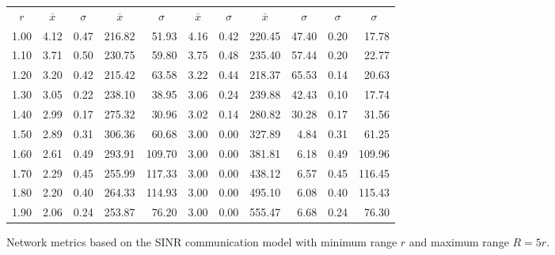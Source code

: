 \documentclass{article}
\begin{document}
\begin{figure}[h]
\begin{center}
\begin{tabular}{|r|rr|rr|rr|rr|rr|}
\hline
\multicolumn{1}{|c|}{$r$} & \multicolumn{1}{|c}{$\overline{x}$} & \multicolumn{1}{c|}{$\sigma$} & \multicolumn{1}{|c}{$\overline{x}$} & \multicolumn{1}{c|}{$\sigma$} & \multicolumn{1}{|c}{$\overline{x}$} & \multicolumn{1}{c|}{$\sigma$} & \multicolumn{1}{|c}{$\overline{x}$} & \multicolumn{1}{c|}{$\sigma$} & \multicolumn{1}{|c}{$\sigma$} & \multicolumn{1}{c|}{$\sigma$}\\
1.00 & 4.12 & 0.47 & 216.82 & 51.93 & 4.16 & 0.42 & 220.45 & 47.40 & 0.20 & 17.78\\
1.10 & 3.71 & 0.50 & 230.75 & 59.80 & 3.75 & 0.48 & 235.40 & 57.44 & 0.20 & 22.77\\
1.20 & 3.20 & 0.42 & 215.42 & 63.58 & 3.22 & 0.44 & 218.37 & 65.53 & 0.14 & 20.63\\
1.30 & 3.05 & 0.22 & 238.10 & 38.95 & 3.06 & 0.24 & 239.88 & 42.43 & 0.10 & 17.74\\
1.40 & 2.99 & 0.17 & 275.32 & 30.96 & 3.02 & 0.14 & 280.82 & 30.28 & 0.17 & 31.56\\
1.50 & 2.89 & 0.31 & 306.36 & 60.68 & 3.00 & 0.00 & 327.89 &  4.84 & 0.31 & 61.25\\
1.60 & 2.61 & 0.49 & 293.91 & 109.70 & 3.00 & 0.00 & 381.81 & 6.18 & 0.49 & 109.96\\
1.70 & 2.29 & 0.45 & 255.99 & 117.33 & 3.00 & 0.00 & 438.12 & 6.57 & 0.45 & 116.45\\
1.80 & 2.20 & 0.40 & 264.33 & 114.93 & 3.00 & 0.00 & 495.10 & 6.08 & 0.40 & 115.43\\
1.90 & 2.06 & 0.24 & 253.87 &  76.20 & 3.00 & 0.00 & 555.47 & 6.68 & 0.24 &  76.30\\
\hline
\end{tabular}
\caption{Network metrics based on the SINR communication model with minimum range $r$ and maximum range $R = 5r$.}
\label{exp_sinr}
\end{center}
\end{figure}
\end{document}
